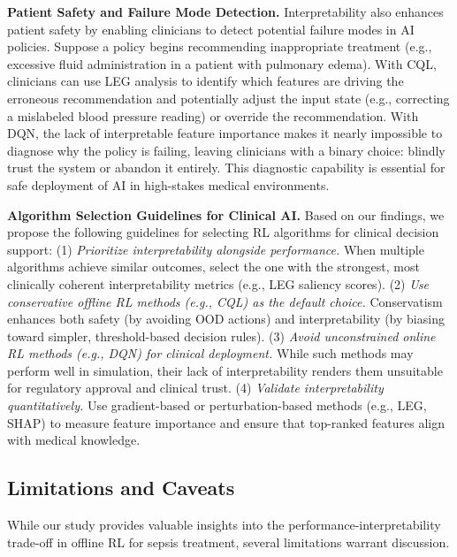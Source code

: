 \textbf{Patient Safety and Failure Mode Detection.} Interpretability also enhances patient safety by enabling clinicians to detect potential failure modes in AI policies. Suppose a policy begins recommending inappropriate treatment (e.g., excessive fluid administration in a patient with pulmonary edema). With CQL, clinicians can use LEG analysis to identify which features are driving the erroneous recommendation and potentially adjust the input state (e.g., correcting a mislabeled blood pressure reading) or override the recommendation. With DQN, the lack of interpretable feature importance makes it nearly impossible to diagnose why the policy is failing, leaving clinicians with a binary choice: blindly trust the system or abandon it entirely. This diagnostic capability is essential for safe deployment of AI in high-stakes medical environments.

\textbf{Algorithm Selection Guidelines for Clinical AI.} Based on our findings, we propose the following guidelines for selecting RL algorithms for clinical decision support: (1) \textit{Prioritize interpretability alongside performance.} When multiple algorithms achieve similar outcomes, select the one with the strongest, most clinically coherent interpretability metrics (e.g., LEG saliency scores). (2) \textit{Use conservative offline RL methods (e.g., CQL) as the default choice.} Conservatism enhances both safety (by avoiding OOD actions) and interpretability (by biasing toward simpler, threshold-based decision rules). (3) \textit{Avoid unconstrained online RL methods (e.g., DQN) for clinical deployment.} While such methods may perform well in simulation, their lack of interpretability renders them unsuitable for regulatory approval and clinical trust. (4) \textit{Validate interpretability quantitatively.} Use gradient-based or perturbation-based methods (e.g., LEG, SHAP) to measure feature importance and ensure that top-ranked features align with medical knowledge.


\subsection{Limitations and Caveats}\label{sec:discussion:limitations}

While our study provides valuable insights into the performance-interpretability trade-off in offline RL for sepsis treatment, several limitations warrant discussion.


